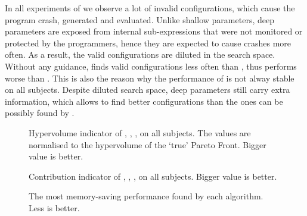 In all experiments of \dr{} we observe a lot of invalid configurations, which cause the program crash, generated and evaluated.
Unlike shallow parameters, deep parameters are exposed from internal sub-expressions that were not monitored or protected by the programmers, hence they are expected to cause crashes more often. As a result, the valid configurations are diluted in the search space. Without any guidance, \dr{} finds valid configurations less often than \sr{}, thus performs worse than \sr{}. This is also the reason why the performance of \dn{} is not alway stable on all subjects. Despite diluted search space, deep parameters still carry extra information, which allows \dn{} to find better configurations than the ones can be possibly found by \sn{}.
 
\begin{figure}[htbp]
	\centering
	\caption{Hypervolume indicator of \sr{}, \sn{}, \dr{}, \dn{} on all subjects. The values are normalised to the hypervolume of the `true' Pareto Front. Bigger value is better.}\label{fig_hypervolume}
\end{figure}

\begin{figure}[htbp]
	\centering
	\caption{Contribution indicator of \sr{}, \sn{}, \dr{}, \dn{} on all subjects. Bigger value is better.}\label{fig_contribution}
\end{figure}

\begin{figure}[htb]
	\centering
	\caption{The most memory-saving performance found by each algorithm. Less is better.}\label{fig_best_memory}
\end{figure}

